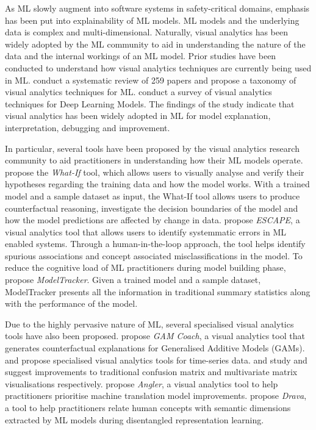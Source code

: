 \documentclass[acmsmall,screen,review,anonymous]{acmart}
\begin{document}

As ML slowly augment into software systems in safety-critical domains, emphasis has been put into explainability of ML models. ML models and the underlying data is complex and multi-dimensional. Naturally, visual analytics has been widely adopted by the ML community to aid in understanding the nature of the data and the internal workings of an ML model. Prior studies have been conducted to understand how visual analytics techniques are currently being used in ML. \citeauthor{yuan2021survey} conduct a systematic review of 259 papers and propose a taxonomy of visual analytics techniques for ML. \citeauthor{hohman2019visual} conduct a survey of visual analytics techniques for Deep Learning Models. The findings of the study indicate that visual analytics has been widely adopted in ML for model explanation, interpretation, debugging and improvement.

In particular, several tools have been proposed by the visual analytics research community to aid practitioners in understanding how their ML models operate. \citeauthor{wexler2020if} propose the \textit{What-If} tool, which allows users to visually analyse and verify their hypotheses regarding the training data and how the model works. With a trained model and a sample dataset as input, the What-If tool allows users to produce counterfactual reasoning, investigate the decision boundaries of the model and how the model predictions are affected by change in data. \citeauthor{ahn2023escape} propose \textit{ESCAPE}, a visual analytics tool that allows users to identify systemmatic errors in ML enabled systems. Through a human-in-the-loop approach, the tool helps identify spurious associations and concept associated misclassifications in the model. To reduce the cognitive load of ML practitioners during model building phase, \citeauthor{amershi2015modeltracker} propose \textit{ModelTracker}. Given a trained model and a sample dataset, ModelTracker presents all the information in traditional summary statistics along with the performance of the model.

Due to the highly pervasive nature of ML, several specialised visual analytics tools have also been proposed. \citeauthor{wang2023gam} propose \textit{GAM Coach}, a visual analytics tool that generates counterfactual explanations for Generalised Additive Models (GAMs). \citeauthor{bernard2019visual} and \citeauthor{gschwandtner2018know} propose specialised visual analytics tools for time-series data. \citeauthor{gortler2022neo} and \citeauthor{yang2022pattern} study and suggest improvements to traditional confusion matrix and multivariate matrix visualisations respectively. \citeauthor{robertson2023angler} propose \textit{Angler}, a visual analytics tool to help practitioners prioritise machine translation model improvements. \citeauthor{wang2023drava} propose \textit{Drava}, a tool to help practitioners relate human concepts with semantic dimensions extracted by ML models during disentangled representation learning.
\end{document}
